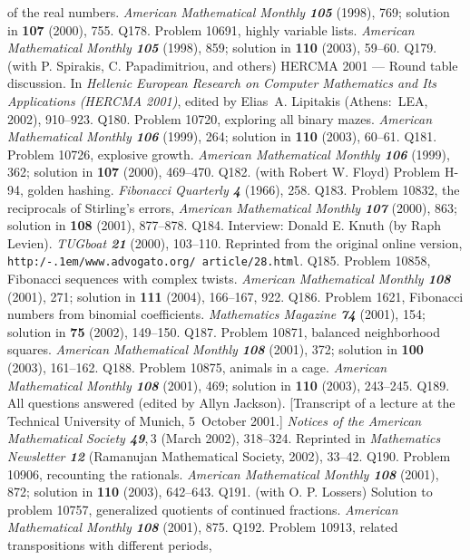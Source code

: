  of the real numbers. {\sl American Mathematical Monthly\/ \bf105} (1998), 769;
 solution in {\bf107} (2000), 755.
\p Q178. Problem 10691, highly variable lists. %
 {\sl American Mathematical Monthly\/ \bf105} (1998), 859;
 solution in {\bf110} (2003), 59--60.
\p Q179. (with P. Spirakis, C. Papadimitriou, and others) HERCMA 2001 ---
 Round table discussion. In {\sl Hellenic European Research on Computer
 Mathematics and Its Applications (HERCMA 2001)}, edited by Elias~A.
 Lipitakis (Athens:\ LEA, 2002), 910--923.
\p Q180. Problem 10720, exploring all binary mazes.
 {\sl American Mathematical Monthly\/ \bf106} (1999), 264;
 solution in {\bf110} (2003), 60--61.
\p Q181. Problem 10726, explosive growth.
 {\sl American Mathematical Monthly\/ \bf106} (1999), 362;
 solution in {\bf107} (2000), 469--470.
\p Q182. (with Robert W. Floyd) Problem H-94, golden hashing.
 {\sl Fibonacci Quarterly\/ \bf4} (1966), 258. %
\p Q183. Problem 10832, the reciprocals of Stirling's errors,
 {\sl American Mathematical Monthly\/ \bf107} (2000), 863;
 solution in {\bf108} (2001), 877--878.
\p Q184. Interview: Donald E. Knuth (by Raph Levien). {\sl TUGboat\/ \bf21}
 (2000), 103--110. Reprinted from the original online version,
 {\tt http:/\kern-.1em/www.advogato.org/ article/28.html}.
\p Q185. Problem 10858, Fibonacci sequences with complex twists.
 {\sl American Mathematical Monthly\/ \bf108} (2001), 271;
 solution in {\bf111} (2004), 166--167, 922.
\p Q186. Problem 1621, Fibonacci numbers from binomial coefficients.
 {\sl Mathematics Magazine\/ \bf74} (2001), 154;
 solution in {\bf75} (2002), 149--150.
\p Q187. Problem 10871, balanced neighborhood squares.
 {\sl American Mathematical Monthly\/ \bf108} (2001), 372;
 solution in {\bf100} (2003), 161--162.
\p Q188. Problem 10875, animals in a cage.
 {\sl American Mathematical Monthly\/ \bf108} (2001), 469;
 solution in {\bf110} (2003), 243--245.
\p Q189. All questions answered (edited by Allyn Jackson). [Transcript
 of a lecture at the Technical University of Munich, 5~October 2001.]
 {\sl Notices of the American Mathematical Society\/ \bf49},\,3 (March
 2002), 318--324. Reprinted in {\sl Mathematics Newsletter\/ \bf12}
 (Ramanujan Mathematical Society, 2002), 33--42.
\p Q190. Problem 10906, recounting the rationals.
 {\sl American Mathematical Monthly\/ \bf108} (2001), 872;
 solution in {\bf110} (2003), 642--643.
\p Q191. (with O. P. Lossers) Solution to problem 10757, generalized quotients
 of continued fractions. {\sl American Mathematical Monthly\/ \bf108}
 (2001), 875.
\p Q192. Problem 10913, related transpositions with different periods,
